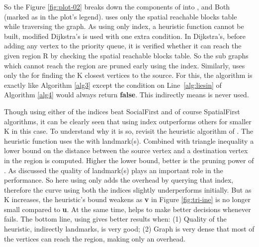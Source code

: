 So the Figure \ref{fig:plot-02} breaks down the components of {\rrp} into {\rrpspatial}, {\rrpsocial} and Both (marked as {\rrp} in the plot's legend). {\rrpspatial} uses only the spatial reachable blocks table while traversing the graph. As using only {\rrpspatial} index, a heuristic function cannot be built, modified Dijkstra's is used with one extra condition. In Dijkstra's, before adding any vertex to the priority queue, it is verified whether it can reach the given region R by checking the spatial reachable blocks table. So the sub graphs which cannot reach the region are pruned early using the index. Similarly, {\rrpsocial} uses only the {\rrpsocial} for finding the K closest vertices to the source. For this, the algorithm is exactly like Algorithm \ref{alg3} except the condition on Line~\ref{alg:liesin} of Algorithm \ref{alg4} would always return \textbf{false}. This indirectly means {\rrpspatial} is never used.

Though using either of the indices beat SocialFirst and of course SpatialFirst algorithms, it can be clearly seen that using {\rrpsocial} index outperforms others for smaller K in this case. To understand why it is so, revisit the heuristic algorithm of {\rrp}. The heuristic function uses the {\rrpsocial} with landmark(s). Combined with triangle inequality a lower bound on the distance between the source vertex and a destination vertex in the region is computed. Higher the lower bound, better is the pruning power of {\rrp}. As discussed the quality of landmark(s) plays an important role in the performance. So here using {\rrpspatial} only adds the overhead by querying that index, therefore the curve using both the indices slightly underperforms initially. But as K increases, the heuristic’s bound weakens as \textbf{v} in Figure \ref{fig:tri-ine} is no longer small compared to \textbf{u}. At the same time, {\rrpspatial} helps {\rrp} to make better decisions whenever {\rrpsocial} fails. The bottom line, using {\rrpsocial} gives better results when: (1) Quality of the heuristic, indirectly landmarks, is very good; (2) Graph is very dense that most of the vertices can reach the region, making {\rrpspatial} only an overhead.

